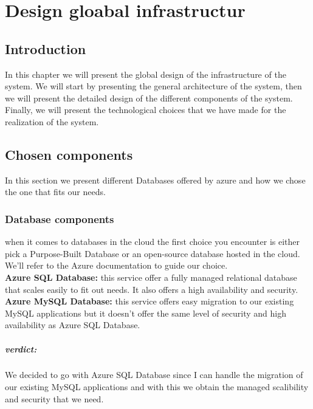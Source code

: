 \chapter{Design gloabal infrastructur}

\section*{Introduction}
\noindent
In this chapter we will present the global design of the infrastructure of the system. We will start by presenting the general architecture of the system, then we will present the detailed design of the different components of the system. Finally, we will present the technological choices that we have made for the realization of the system.

\section{Chosen components}
In this section we present different Databases offered by azure and how we chose the one that fits our needs.
\subsection{Database components}
when it comes to databases in the cloud the first choice you encounter is either pick a Purpose-Built Database or an open-source database hosted in the cloud.
\\ We'll refer to the Azure documentation \cite{webArticle3} to guide our choice.
\\
\textbf{Azure SQL Database:} this service offer a fully managed relational database that scales easily to fit out needs. It also offers a high availability and security.
\\
\textbf{Azure MySQL Database:} this service offers easy migration to our existing MySQL applications but it doesn't offer the same level of security and high availability as Azure SQL Database.
\paragraph*{verdict:}
We decided to go with Azure SQL Database since I can handle the migration of our existing MySQL applications and with this we obtain the managed scalibility and security that we need.

